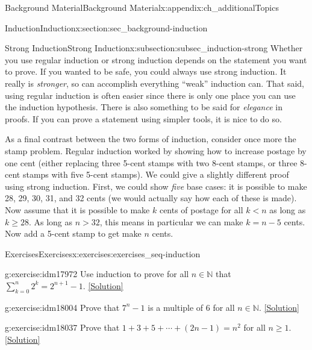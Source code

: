\documentclass[oneside,10pt,]{book}
\numberwithin{equation}{chapter}
\def\d{\displaystyle}
\def\N{\mathbb N}
\newcommand{\lt}{<}
\begin{document}
\begin{appendixptx}{Background Material}{}{Background Material}{}{}{x:appendix:ch_additionalTopics}
\begin{sectionptx}{Induction}{}{Induction}{}{}{x:section:sec_background-induction}
\begin{subsectionptx}{Strong Induction}{}{Strong Induction}{}{}{x:subsection:subsec_induction-strong}
Whether you use regular induction or strong induction depends on the statement you want to prove. If you wanted to be safe, you could always use strong induction. It really is \emph{stronger}, so can accomplish everything ``weak'' induction can. That said, using regular induction is often easier since there is only one place you can use the induction hypothesis. There is also something to be said for \emph{elegance} in proofs. If you can prove a statement using simpler tools, it is nice to do so.%
\par
As a final contrast between the two forms of induction, consider once more the stamp problem. Regular induction worked by showing how to increase postage by one cent (either replacing three 5-cent stamps with two 8-cent stamps, or three 8-cent stamps with five 5-cent stamps). We could give a slightly different proof using strong induction. First, we could show \emph{five} base cases: it is possible to make 28, 29, 30, 31, and 32 cents (we would actually say how each of these is made). Now assume that it is possible to make \(k\) cents of postage for all \(k \lt  n\) as long as \(k \ge 28\). As long as \(n > 32\), this means in particular we can make \(k = n-5\) cents. Now add a 5-cent stamp to get make \(n\) cents.%
\end{subsectionptx}
%
%
\typeout{************************************************}
\typeout{************************************************}
%
\begin{exercises-subsection}{Exercises}{}{Exercises}{}{}{x:exercises:exercises_seq-induction}
\begin{divisionexercise}{1}{}{}{g:exercise:idm17972}%
Use induction to prove for all \(n \in \N\) that \(\d\sum_{k=0}^n 2^k = 2^{n+1} - 1\).%
\space\hspace*{0pt}\hfill{\tiny\hyperlink{g:solution:idm17977-main}{[Solution]}}\end{divisionexercise}%
\begin{divisionexercise}{2}{}{}{g:exercise:idm18004}%
Prove that \(7^n - 1\) is a multiple of 6 for all \(n \in \N\).%
\space\hspace*{0pt}\hfill{\tiny\hyperlink{g:solution:idm18009-main}{[Solution]}}\end{divisionexercise}%
\begin{divisionexercise}{3}{}{}{g:exercise:idm18037}%
Prove that \(1 + 3 + 5 + \cdots + (2n-1) = n^2\) for all \(n \ge 1\).%
\space\hspace*{0pt}\hfill{\tiny\hyperlink{g:solution:idm18042-main}{[Solution]}}\end{divisionexercise}%

\end{exercises-subsection}
\end{sectionptx}
\end{appendixptx}
\end{document}

